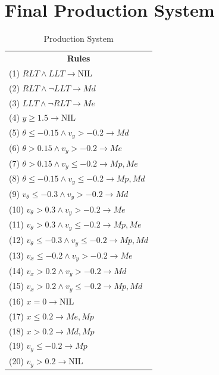 \documentclass[a4paper, 12pt, fleqn]{report}
\begin{document}
\newpage
\section*{\fontsize{16}{20}\selectfont Final Production System}
\label{sec:production_system} %
\begin{table}[h!]

    \begin{tabular}{p{16cm}} 

    \multicolumn{1}{c}{\textbf{Rules}} \\ 
    
    
    
    (1) $RLT \land LLT \rightarrow \text{NIL}$  \\  
    (2) $RLT \land \neg LLT \rightarrow Md$ \\  
    (3) $LLT \land \neg RLT \rightarrow Me$  \\  
    (4) $y \ge 1.5 \rightarrow \text{NIL}$  \\  
    (5) $\theta \leq -0.15 \land v_y > -0.2 \rightarrow Md$  \\  
    (6) $\theta > 0.15 \land v_y > -0.2 \rightarrow Me$  \\  
    (7) $\theta > 0.15 \land v_y \leq -0.2 \rightarrow Mp, Me$  \\  
    (8) $\theta \leq -0.15 \land v_y \leq -0.2 \rightarrow Mp, Md$  \\  
    (9) $v_\theta \leq -0.3 \land v_y > -0.2 \rightarrow Md$  \\  
    (10) $v_\theta > 0.3 \land v_y > -0.2 \rightarrow Me$  \\  
    (11) $v_\theta > 0.3 \land v_y \leq -0.2 \rightarrow Mp, Me$  \\  
    (12) $v_\theta \leq -0.3 \land v_y \leq -0.2 \rightarrow Mp, Md$  \\  
    (13) $v_x \leq -0.2  \land v_y > -0.2 \rightarrow Me$  \\  
    (14) $v_x > 0.2  \land v_y > -0.2 \rightarrow Md$   \\  
    (15) $v_x > 0.2 \land v_y \leq -0.2 \rightarrow Mp, Md$  \\  
    (16) $x = 0 \rightarrow \text{NIL}$ \\  
    (17) $x \leq 0.2   \rightarrow  Me, Mp$  \\  
    (18) $x > 0.2   \rightarrow  Md, Mp$ \\  
    (19) $v_y \leq -0.2 \rightarrow Mp$  \\  
    (20) $v_y > 0.2 \rightarrow \text{NIL}$ \\  
    
    \end{tabular}
    \caption{Production System}
    \label{tab:production}
\end{table}
\end{document}
